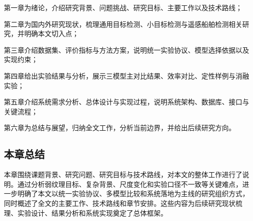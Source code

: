 第一章为绪论，介绍研究背景、问题挑战、研究目标、主要工作以及技术路线；

第二章为国内外研究现状，梳理通用目标检测、小目标检测与遥感船舶检测相关研究，并明确本文切入点；

第三章介绍数据集、评价指标与方法方案，说明统一实验协议、模型选择依据以及实现约束；

第四章给出实验结果与分析，展示三模型主对比结果、效率对比、定性样例与消融实验；

第五章介绍系统需求分析、总体设计与实现过程，说明系统架构、数据库、接口与关键流程；

第六章为总结与展望，归纳全文工作，分析当前边界，并给出后续研究方向。

\subsection{本章总结}

本章围绕课题背景、研究问题、研究目标与技术路线，对本文的整体工作进行了说明。通过分析弱纹理目标、复杂背景、尺度变化和实验口径不一致等关键难点，进一步明确了本文以统一实验协议、多模型比较和系统落地为主线的研究组织方式，同时概述了全文的主要工作、技术路线和章节安排。这些内容为后续研究现状梳理、实验设计、结果分析和系统实现奠定了总体框架。
